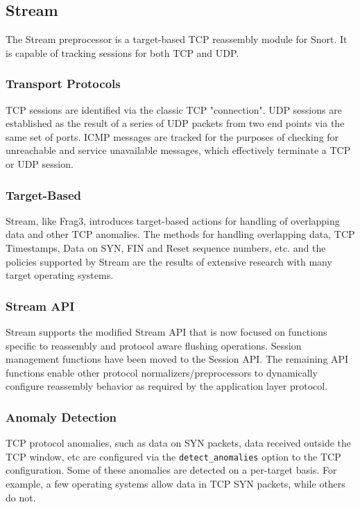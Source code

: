 \documentclass[english]{report}
\begin{document}
\subsection{Stream}
\label{stream5 section}

The Stream preprocessor is a target-based TCP reassembly module for Snort.  It
is capable of tracking sessions for both TCP and UDP.  

\subsubsection{Transport Protocols}

TCP sessions are identified via the classic TCP "connection".  UDP sessions are
established as the result of a series of UDP packets from two end points via
the same set of ports.  ICMP messages are tracked for the purposes of checking
for unreachable and service unavailable messages, which effectively terminate a
TCP or UDP session.

\subsubsection{Target-Based}

Stream, like Frag3, introduces target-based actions for handling of
overlapping data and other TCP anomalies.  The methods for handling overlapping
data, TCP Timestamps, Data on SYN, FIN and Reset sequence numbers, etc. and the
policies supported by Stream are the results of extensive research with many
target operating systems.

\subsubsection{Stream API}

Stream supports the modified Stream API that is now focused on
functions specific to reassembly and protocol aware flushing
operations.  Session management functions have been moved to the
Session API.  The remaining API functions enable other protocol 
normalizers/preprocessors to dynamically configure reassembly 
behavior as required by the application layer protocol.

\subsubsection{Anomaly Detection}

TCP protocol anomalies, such as data on SYN packets, data received outside the
TCP window, etc are configured via the \texttt{detect\_anomalies} option to the
TCP configuration.  Some of these anomalies are detected on a per-target basis.
For example, a few operating systems allow data in TCP SYN packets, while
others do not.
\end{document}
